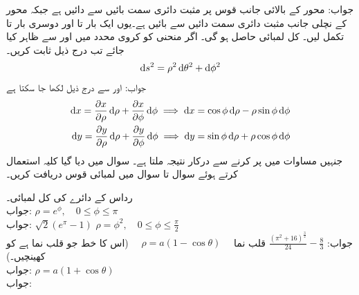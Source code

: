 جواب: محور کے بالائی جانب قوس پر مثبت دائری سمت بائیں سے دائیں ہے جبکہ محور کے نچلی جانب مثبت دائری سمت دائیں سے بائیں ہے۔یوں ایک بار  تا  اور دوسری بار  تا  تکمل لیں۔ کل لمبائی  حاصل ہو گی۔
\quad اگر منحنی کو کروی محدد میں  اور  سے ظاہر کیا جائے تب درج ذیل ثابت کریں۔
\begin{align*}
\dif s^2=\rho^2\dif \theta^2+\dif \phi^2
\end{align*}
جواب: اور  سے درج ذیل لکھا جا سکتا ہے
\begin{align*}
\dif x=\frac{\partial x}{\partial \rho}\dif \rho+\frac{\partial x}{\partial \phi}\dif \phi  \implies \dif x=\cos \phi \dif \rho-\rho\sin \phi\dif \phi\\
\dif y=\frac{\partial y}{\partial \rho}\dif \rho+\frac{\partial y}{\partial \phi}\dif \phi\implies \dif y=\sin \phi \dif \rho+\rho\cos \phi \dif \phi 
\end{align*}
جنہیں مساوات  میں پر کرنے سے درکار نتیجہ ملتا ہے۔
سوال  میں دیا گیا کلیہ استعمال کرتے ہوئے سوال  تا سوال  میں لمبائی قوس دریافت کریں۔

\quad رداس  کے دائرے کی کل لمبائی۔\\
جواب:
\quad
$\rho=e^{\phi},\quad 0\le \phi \le \pi$\\
جواب:
$\sqrt{2}(e^{\pi}-1)$
\quad
$\rho=\phi^2,\quad 0\le \phi \le \tfrac{\pi}{2}$\\
جواب:
$\tfrac{(\pi^2+16)^{\tfrac{3}{2}}}{24}-\tfrac{8}{3}$
\quad قلب نما 
$\quad \rho=a(1-\cos \theta)\quad $
(اس کا خط جو قلب نما ہے کو کھینچیں۔)\\
جواب:
\quad
$\rho=a(1+\cos \theta)$\\
جواب:


